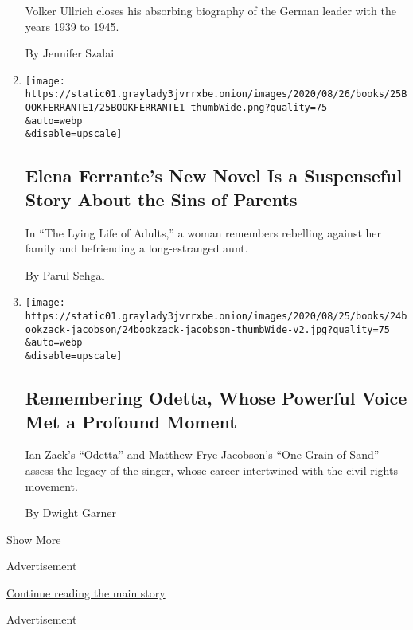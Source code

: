 \begin{enumerate}
  Volker Ullrich closes his absorbing biography of the German leader
  with the years 1939 to 1945.

  By Jennifer Szalai
\item
  \href{/2020/08/25/books/review-lying-life-of-adults-elena-ferrante.html}{}

  \texttt{[image: https://static01.graylady3jvrrxbe.onion/images/2020/08/26/books/25BOOKFERRANTE1/25BOOKFERRANTE1-thumbWide.png?quality=75\\\&auto=webp\\\&disable=upscale]}

  \hypertarget{elena-ferrantes-new-novel-is-a-suspenseful-story-about-the-sins-of-parents}{%
  \subsection{Elena Ferrante's New Novel Is a Suspenseful Story About
  the Sins of
  Parents}\label{elena-ferrantes-new-novel-is-a-suspenseful-story-about-the-sins-of-parents}}

  In ``The Lying Life of Adults,'' a woman remembers rebelling against
  her family and befriending a long-estranged aunt.

  By Parul Sehgal
\item
  \href{/2020/08/24/books/review-odetta-biography-ian-zack-one-grain-of-sand-matthew-frye-jacobson.html}{}

  \texttt{[image: https://static01.graylady3jvrrxbe.onion/images/2020/08/25/books/24bookzack-jacobson/24bookzack-jacobson-thumbWide-v2.jpg?quality=75\\\&auto=webp\\\&disable=upscale]}

  \hypertarget{remembering-odetta-whose-powerful-voice-met-a-profound-moment}{%
  \subsection{Remembering Odetta, Whose Powerful Voice Met a Profound
  Moment}\label{remembering-odetta-whose-powerful-voice-met-a-profound-moment}}

  Ian Zack's ``Odetta'' and Matthew Frye Jacobson's ``One Grain of
  Sand'' assess the legacy of the singer, whose career intertwined with
  the civil rights movement.

  By Dwight Garner
\end{enumerate}

Show More

Advertisement

\protect\hyperlink{after-mid1}{Continue reading the main story}

Advertisement

